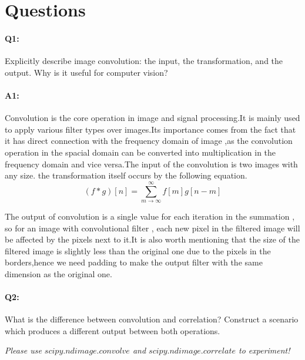 \section*{Questions}

\paragraph{Q1:} Explicitly describe image convolution: the input, the transformation, and the output. Why is it useful for computer vision?

\paragraph{A1:} Convolution is the core operation in image and signal processing.It is mainly used to apply various filter types over images.Its importance comes from the fact that it has direct connection with the frequency domain of image ,as the convolution operation in the spacial domain can be converted into multiplication in the frequency domain and vice versa.The input of the convolution is two images with any size. the transformation itself occurs by the following equation.
\begin{equation}
(f\ast g)[n]=\sum^{\infty}_{m \rightarrow \infty} f[m]g[n-m]
\label{eq:one}
\end{equation}

The  output of  convolution is a single value for each iteration in the summation , so for an image with convolutional filter , each new pixel in the filtered image will be affected by the pixels next to it.It is also worth mentioning that the size of the filtered image is slightly less than the original one due to the pixels in the borders,hence we need padding to make the output filter with the same dimension as the original one.



\pagebreak
\paragraph{Q2:} What is the difference between convolution and correlation? Construct a scenario which produces a different output between both operations.

\emph{Please use \href{https://docs.scipy.org/doc/scipy/reference/generated/scipy.ndimage.convolve.html}{$scipy.ndimage.convolve$} and \href{https://docs.scipy.org/doc/scipy/reference/generated/scipy.ndimage.correlate.html}{$scipy.ndimage.correlate$} to experiment!}

